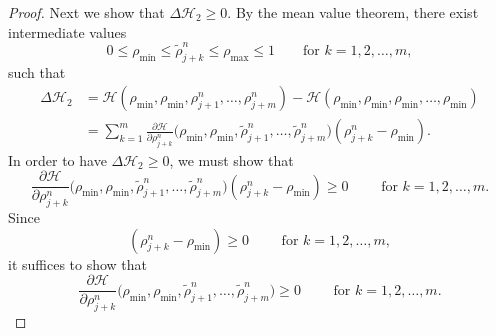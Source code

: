 \begin{proof}
    Next we show that $\Delta \mathcal{H}_2 \geq 0$. By the mean value theorem,
    there exist intermediate values
    \[ 0 \leq \rho_{\min} \leq \tilde{\rho}_{j+k}^n \leq \rho_{\max} \leq 1 \qquad \text{for } k= 1,2,\dots, m,\]
    such that
    \begin{align*}
        \Delta \mathcal{H}_2 & = \mathcal{H}( \rho_{\min}, \rho_{\min},  \rho_{j+1}^n,\dots,  \rho_{j+m}^n) - \mathcal{H}(\rho_{\min}, \rho_{\min}, \rho_{\min},\dots, \rho_{\min})                          \\
                             & = \sum_{k=1}^{m} \frac{\partial \mathcal{H}}{\partial \rho_{j+k}^n}\bigl(\rho_{\min},\rho_{\min},\tilde\rho_{j+1}^n,\dots,\tilde\rho_{j+m}^n\bigr)(\rho_{j+k}^n-\rho_{\min}).
    \end{align*}
    In order to have $\Delta \mathcal{H}_2 \geq 0$, we must show that
    \[
        \frac{\partial \mathcal{H}}{\partial \rho_{j+k}^n}
        \bigl(
        \rho_{\min},\rho_{\min},
        \tilde\rho_{j+1}^n,\dots,\tilde\rho_{j+m}^n
        \bigr)
        (\rho_{j+k}^n-\rho_{\min}) \geq 0 \qquad \text{ for } k= 1,2, \dots, m.
    \]
    Since
    \[
        (\rho_{j+k}^n-\rho_{\min}) \geq 0 \qquad \text{ for } k= 1,2, \dots, m,
    \]
    it suffices to show that
    \[
        \frac{\partial \mathcal{H}}{\partial \rho_{j+k}^n}
        \bigl(
        \rho_{\min},\rho_{\min},
        \tilde\rho_{j+1}^n,\dots,\tilde\rho_{j+m}^n
        \bigr)
        \geq 0 \qquad \text{ for } k= 1,2, \dots, m.
    \]


\end{proof}
